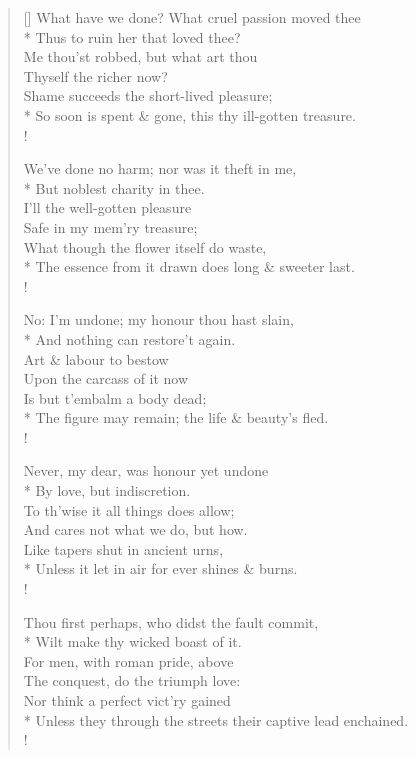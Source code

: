 \documentclass[MAIN]{subfiles}
\begin{document}
\settowidth{\versewidth}{So soon is spent \& gone, this thy ill-gotten treasure.}
\begin{verse}[\versewidth]
\vin What have we done? What cruel passion moved thee\\*
\vin \vin Thus to ruin her that loved thee?\\
\vin Me thou'st robbed, but what art thou\\
\vin Thyself the richer now?\\
\vin \vin Shame succeeds the short-lived pleasure;\\*
So soon is spent \& gone, this thy ill-gotten treasure.\\!

\vin We've done no harm; nor was it theft in me,\\*
\vin \vin But noblest charity in thee.\\
\vin I'll the well-gotten pleasure\\
\vin Safe in my mem'ry treasure;\\
\vin \vin What though the flower itself do waste,\\*
The essence from it drawn does long \& sweeter last.\\!

\vin No: I'm undone; my honour thou hast slain,\\*
\vin \vin And nothing can restore't again.\\
\vin Art \& labour to bestow\\
\vin Upon the carcass of it now\\
\vin \vin Is but t'embalm a body dead;\\*
The figure may remain; the life \& beauty's fled.\\!

\vin Never, my dear, was honour yet undone\\*
\vin \vin By love, but indiscretion.\\
\vin To th'wise it all things does allow;\\
\vin And cares not what we do, but how.\\
\vin \vin Like tapers shut in ancient urns,\\*
Unless it let in air for ever shines \& burns.\\!

\vin Thou first perhaps, who didst the fault commit,\\*
\vin \vin Wilt make thy wicked boast of it.\\
\vin For men, with roman pride, above\\
\vin The conquest, do the triumph love:\\
\vin \vin Nor think a perfect vict'ry gained\\*
Unless they through the streets their captive lead enchained.\\!


\end{verse}
\end{document}
